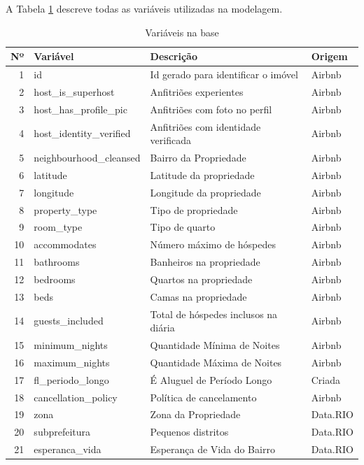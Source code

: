\documentclass[
]{book}
\begin{document}
A Tabela \ref{tab:desc_variaveis} descreve todas as variáveis utilizadas
na modelagem.

\begin{table}

\caption{\label{tab:desc_variaveis}Variáveis na base}
\centering
\begin{tabular}[t]{r|l|l|l}
\hline
Nº & Variável & Descrição & Origem\\
\hline
1 & id & Id gerado para identificar o imóvel & Airbnb\\
\hline
2 & host\_is\_superhost & Anfitriões experientes & Airbnb\\
\hline
3 & host\_has\_profile\_pic & Anfitriões com foto no perfil & Airbnb\\
\hline
4 & host\_identity\_verified & Anfitriões com identidade verificada & Airbnb\\
\hline
5 & neighbourhood\_cleansed & Bairro da Propriedade & Airbnb\\
\hline
6 & latitude & Latitude da propriedade & Airbnb\\
\hline
7 & longitude & Longitude da propriedade & Airbnb\\
\hline
8 & property\_type & Tipo de propriedade & Airbnb\\
\hline
9 & room\_type & Tipo de quarto & Airbnb\\
\hline
10 & accommodates & Número máximo de hóspedes & Airbnb\\
\hline
11 & bathrooms & Banheiros na propriedade & Airbnb\\
\hline
12 & bedrooms & Quartos na propriedade & Airbnb\\
\hline
13 & beds & Camas na propriedade & Airbnb\\
\hline
14 & guests\_included & Total de hóspedes inclusos na diária & Airbnb\\
\hline
15 & minimum\_nights & Quantidade Mínima de Noites & Airbnb\\
\hline
16 & maximum\_nights & Quantidade Máxima de Noites & Airbnb\\
\hline
17 & fl\_periodo\_longo & É Aluguel de Período Longo & Criada\\
\hline
18 & cancellation\_policy & Política de cancelamento & Airbnb\\
\hline
19 & zona & Zona da Propriedade & Data.RIO\\
\hline
20 & subprefeitura & Pequenos distritos & Data.RIO\\
\hline
21 & esperanca\_vida & Esperança de Vida do Bairro & Data.RIO\\

\end{tabular}
\end{table}
\end{document}
